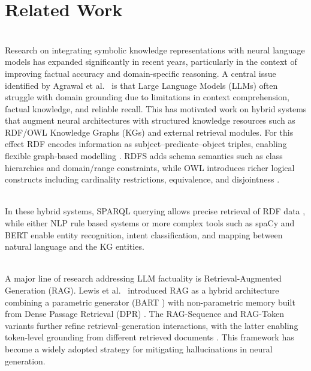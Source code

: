 \documentclass{article}
\begin{document}

\section{Related Work}

\noindent
\\
Research on integrating symbolic knowledge representations with neural language models has expanded significantly in recent years, particularly in the context of improving factual accuracy and domain-specific reasoning. A central issue identified by Agrawal et al.~\cite{agrawal2024kg_hallucinations} is that Large Language Models (LLMs) often struggle with domain grounding due to limitations in context comprehension, factual knowledge, and reliable recall. This has motivated work on hybrid systems that augment neural architectures with structured knowledge resources such as RDF/OWL Knowledge Graphs (KGs) and external retrieval modules. For this effect RDF encodes information as subject–predicate–object triples, enabling flexible graph-based modelling \cite{KL2025slides}. RDFS adds schema semantics such as class hierarchies and domain/range constraints, while OWL introduces richer logical constructs including cardinality restrictions, equivalence, and disjointness \cite{KL2025slides}.

\noindent
\\
In these hybrid systems, SPARQL querying allows precise retrieval of RDF data \cite{KL2025slides}, while either NLP rule based systems or more complex tools such as spaCy \cite{honnibal2020spacy} and BERT \cite{devlin2019bert} enable entity recognition, intent classification, and mapping between natural language and the KG entities. 


\noindent
\\
A major line of research addressing LLM factuality is Retrieval-Augmented Generation (RAG). Lewis et al.~\cite{lewis2020rag} introduced RAG as a hybrid architecture combining a parametric generator (BART \cite{lewis2019bart}) with non-parametric memory built from Dense Passage Retrieval (DPR) \cite{karpukhin2020dense_passage_retrieval}. The RAG-Sequence and RAG-Token variants further refine retrieval–generation interactions, with the latter enabling token-level grounding from different retrieved documents \cite{lewis2020rag}. This framework has become a widely adopted strategy for mitigating hallucinations in neural generation.
\end{document}
